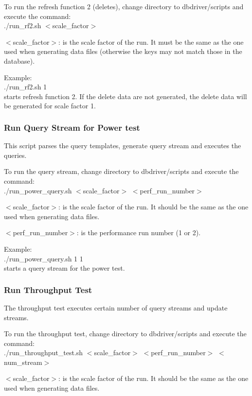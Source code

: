 \documentclass{article}
\begin{document}
\noindent
To run the refresh function 2 (deletes), change directory to
dbdriver/scripts and execute the command: \\
\indent ./run\_rf2.sh  $<$scale\_factor$>$ 

\noindent
$<$scale\_factor$>$: is the scale factor of the run.  It must be the same
as the one used when generating data files (otherwise the keys may
not match those in the database).

\noindent
Example: \\
\indent ./run\_rf2.sh 1 \\
\indent starts refresh function 2.  If the delete data are not generated,  the delete data will be generated for scale factor 1.

\subsubsection{Run Query Stream for Power test}

\noindent
This script parses the query templates, generate query stream and
executes the queries.

\noindent
To run the query stream, change directory to dbdriver/scripts and
execute the command: \\
\indent ./run\_power\_query.sh  $<$scale\_factor$>$ $<$perf\_run\_number$>$ 

\noindent
$<$scale\_factor$>$: is the scale factor of the run.  It should be the same
as the one used when generating data files.

\noindent
$<$perf\_run\_number$>$: is the performance run number (1 or 2).  

Example: \\
\indent ./run\_power\_query.sh 1 1 \\
\indent starts a query stream for the power test.  

\subsubsection{Run Throughput Test}

\noindent
The throughput test executes certain number of query streams and update
streams.

\noindent
To run the throughput test, change directory to dbdriver/scripts and
execute the command: \\
\indent ./run\_throughput\_test.sh  $<$scale\_factor$>$ $<$perf\_run\_number$>$  $<$num\_stream$>$

\noindent
$<$scale\_factor$>$: is the scale factor of the run.  It should be the same
as the one used when generating data files.
\end{document}
